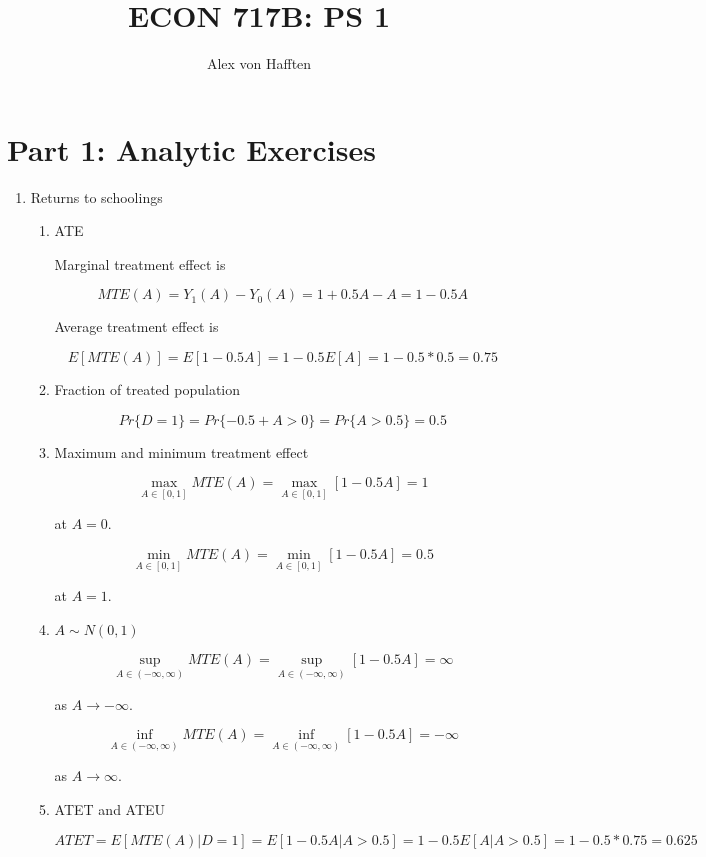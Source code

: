 \documentclass{article}
\title{ECON 717B: PS 1}
\author{Alex von Hafften}
\begin{document}
\maketitle

\section{Part 1: Analytic Exercises}

\begin{enumerate}

\item Returns to schoolings

\begin{enumerate}

\item ATE

Marginal treatment effect is

$$
MTE(A) = Y_1(A) - Y_0(A) = 1 + 0.5A - A = 1 - 0.5A
$$

Average treatment effect is

$$
E[MTE(A)] = E[1 - 0.5A] = 1 - 0.5E[A] = 1 - 0.5*0.5 = 0.75
$$

\item Fraction of treated population

$$
Pr\{D = 1\} = Pr\{-0.5 + A > 0 \} = Pr\{A > 0.5 \} = 0.5
$$

\item Maximum and minimum treatment effect

$$
\max_{A \in [0,1]} MTE(A) = \max_{A \in [0,1]} [1 - 0.5A] = 1
$$

at $A = 0$.

$$
\min_{A \in [0,1]} MTE(A) = \min_{A \in [0,1]} [1 - 0.5A] = 0.5
$$

at $A = 1$.


\item $A \sim N(0, 1)$

$$
\sup_{A \in (-\infty,\infty)} MTE(A) = \sup_{A \in (-\infty,\infty)} [1 - 0.5A] = \infty
$$

as $A \to -\infty$.

$$
\inf_{A \in (-\infty,\infty)} MTE(A) = \inf_{A \in (-\infty,\infty)} [1 - 0.5A] = -\infty
$$

as $A \to \infty$.

\item ATET and ATEU

$$
ATET = E[MTE(A) | D = 1] = E[1- 0.5A | A > 0.5] = 1- 0.5 E[A | A > 0.5] = 1 - 0.5*0.75 = 0.625
$$


\end{enumerate}
\end{enumerate}
\end{document}
